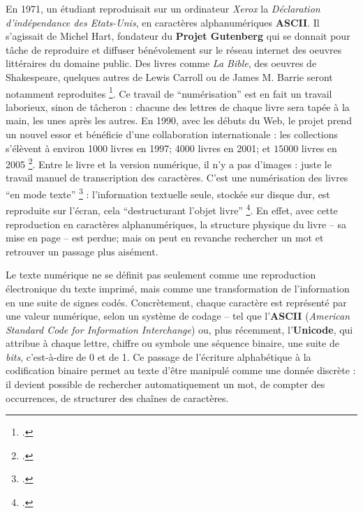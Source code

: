 En 1971, un étudiant reproduisait sur un ordinateur \emph{Xerox} la \emph{Déclaration d'indépendance des Etats-Unis}, en caractères alphanumériques \textbf{ASCII}. Il s'agissait de Michel Hart, fondateur du \textbf{Projet Gutenberg} qui se donnait pour tâche de reproduire et diffuser bénévolement sur le réseau internet des oeuvres littéraires du domaine public. Des livres comme \emph{La Bible}, des oeuvres de Shakespeare, quelques autres de Lewis Carroll ou de James M. Barrie seront notamment reproduites \footcite[][]{lebert}. Ce travail de \enquote{numérisation} est en fait un travail laborieux, sinon de tâcheron : chacune des lettres de chaque livre sera tapée à la main, les unes après les autres. En 1990, avec les débuts du Web, le projet prend un nouvel essor et bénéficie d'une collaboration internationale : les collections s'élèvent à environ 1000 livres en 1997; 4000 livres en 2001; et $15000$ livres en 2005 \footcite[][]{lebert}. Entre le livre et la version numérique, il n'y a pas d'images : juste le travail manuel de transcription des caractères. C'est une numérisation des livres \enquote{en mode texte} \footcite[][30-33]{bermesbook} : l'information textuelle seule, stockée sur disque dur, est reproduite sur l'écran, cela \enquote{destructurant l'objet livre} \footcite[][]{bermesbook}. En effet, avec cette reproduction en caractères alphanumériques, la structure physique du livre -- sa mise en page -- est perdue; mais on peut en revanche rechercher un mot et retrouver un passage plus aisément. 

Le texte numérique ne se définit pas seulement comme une reproduction électronique du texte imprimé, mais comme une transformation de l’information en une suite de signes codés. Concrètement, chaque caractère est représenté par une valeur numérique, selon un système de codage -- tel que l’\textbf{ASCII} (\emph{American Standard Code for Information Interchange}) ou, plus récemment, l’\textbf{Unicode}, qui attribue à chaque lettre, chiffre ou symbole une séquence binaire, une suite de \emph{bits}, c’est-à-dire de 0 et de 1. Ce passage de l’écriture alphabétique à la codification binaire permet au texte d’être manipulé comme une donnée discrète : il devient possible de rechercher automatiquement un mot, de compter des occurrences, de structurer des chaînes de caractères.

